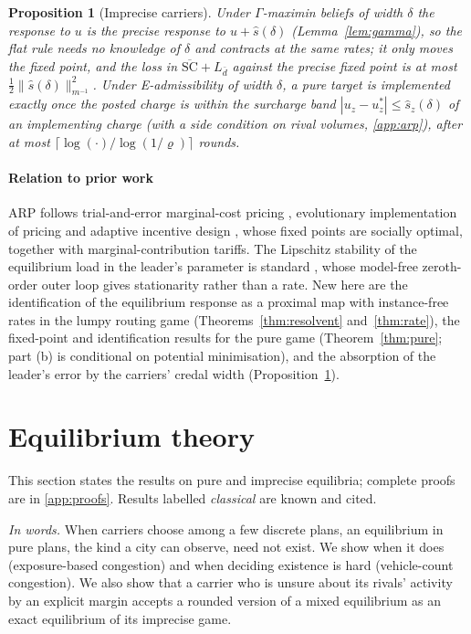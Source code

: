 \documentclass[preprint,12pt]{elsarticle}
\newtheorem{proposition}[theorem]{Proposition}
\theoremstyle{definition}
\theoremstyle{remark}
\begin{document}
\begin{proposition}[Imprecise carriers]\label{prop:arpcredal}
Under $\Gamma$-maximin beliefs of width $\delta$ the response to $u$ is the precise response to $u+\hat s(\delta)$ (Lemma~\ref{lem:gamma}), so the flat rule needs no knowledge of $\delta$ and contracts at the same rates; it only moves the fixed point, and the loss in $\overline{\mathrm{SC}}+L_{\bar d}$ against the precise fixed point is at most $\tfrac12\|\hat s(\delta)\|_{m^{-1}}^2$. Under E-admissibility of width $\delta$, a pure target is implemented exactly once the posted charge is within the surcharge band $|u_z-u^*_z|\le\hat s_z(\delta)$ of an implementing charge (with a side condition on rival volumes, \ref{app:arp}), after at most $\lceil\log(\cdot)/\log(1/\varrho)\rceil$ rounds.
\end{proposition}

\paragraph{Relation to prior work} ARP follows trial-and-error marginal-cost pricing \citep{Yang2004,HanYang2009,YeYangTan2015}, evolutionary implementation of pricing \citep{Sandholm2002} and adaptive incentive design \citep{Maheshwari2022,Maheshwari2026}, whose fixed points are socially optimal, together with marginal-contribution tariffs. The Lipschitz stability of the equilibrium load in the leader's parameter is standard \citep[cf.][Lemma~2.6]{Masiha2026}, whose model-free zeroth-order outer loop gives stationarity rather than a rate. New here are the identification of the equilibrium response as a proximal map with instance-free rates in the lumpy routing game (Theorems~\ref{thm:resolvent} and~\ref{thm:rate}), the fixed-point and identification results for the pure game (Theorem~\ref{thm:pure}; part (b) is conditional on potential minimisation), and the absorption of the leader's error by the carriers' credal width (Proposition~\ref{prop:arpcredal}).


\section{Equilibrium theory}\label{sec:theory}

This section states the results on pure and imprecise equilibria; complete proofs are in \ref{app:proofs}. Results labelled \emph{classical} are known and cited.

\emph{In words.} When carriers choose among a few discrete plans, an equilibrium in pure plans, the kind a city can observe, need not exist. We show when it does (exposure-based congestion) and when deciding existence is hard (vehicle-count congestion). We also show that a carrier who is unsure about its rivals' activity by an explicit margin accepts a rounded version of a mixed equilibrium as an exact equilibrium of its imprecise game.
\end{document}
